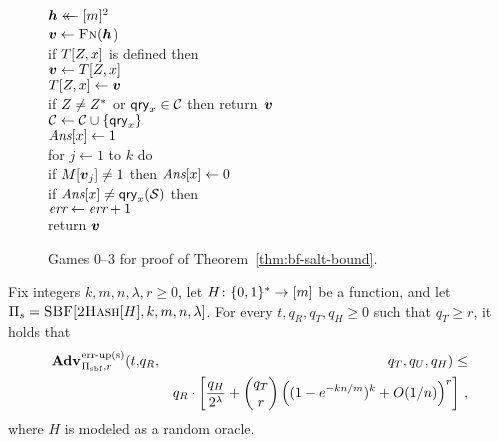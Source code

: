 \begin{figure}
{      $\hh \getsr [m]^2$\\
      $\vv \gets \fff(\hh$)\\
      if $T[Z,x]$ is defined then\\
      \tab $\vv \gets T[\salt,x]$\\
      $T[\salt,x] \gets \vv$\\
      if $Z \ne Z^*$ or $\mathsf{qry}_x \in \mathcal{C}$ then return~$\vv$\\
      $\mathcal{C} \gets \mathcal{C} \cup \{\mathsf{qry}_x\}$\\
      $\textit{Ans}[x] \gets 1$\\
      for $j \gets 1$ to $k$ do\\
      \tab\tab if $M[\vv_j] \neq 1$ then $\textit{Ans}[x] \gets 0$\\
      if $\textit{Ans}[x] \ne \mathsf{qry}_x(\mathcal{S})$ then\\
      \tab $\textit{err} \gets \textit{err} + 1$\\
      return $\vv$
  }
  \caption{Games 0--3 for proof of Theorem~\ref{thm:bf-salt-bound}.}
  \label{fig:bf-salt-bound}
\end{figure}

\begin{theorem}\label{thm:bf-priv-salt-bound}
Fix integers $k, m, n, \lambda, r\geq 0$, let $H \colon \{0,1\}^* \to [m]$ be a function, and let $\mathrm{\Pi}_s = \textsc{SBF}[\textsc{2Hash}[H],k,m,n,\lambda]$.
  For every $t, q_R, q_T, q_H \geq 0$ such that $q_T \geq r$, it holds that
  \begin{eqnarray*}
    \Adv{\erreps}_{\struct_\saltybloom,r}(t,&q_R,& q_T, q_U, q_H) \leq \\ && q_R \cdot
     \left[
      \frac{q_H}{2^\lambda} +
      {\dbinom{q_T}{r}} \left( (1-e^{-kn/m})^k + O(1/n) \right)^r
    \right] \,,
\end{eqnarray*}
where $H$ is modeled as a random oracle.
\end{theorem}

